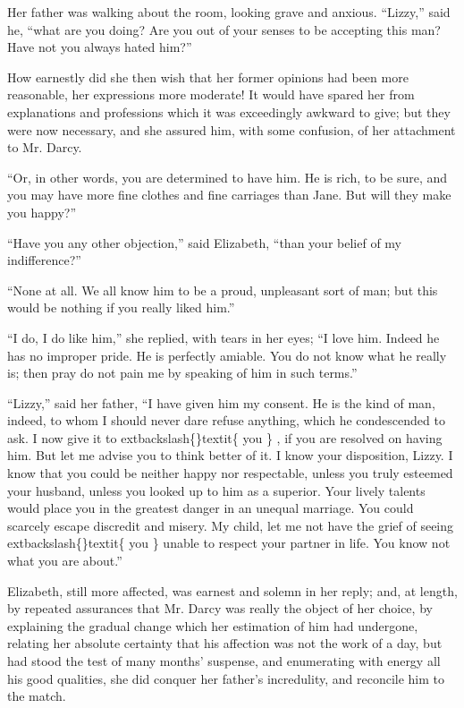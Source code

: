 \documentclass[10pt]{book}
\begin{document}
   Her father was walking about the room, looking grave and anxious.
“Lizzy,” said he, “what are you doing? Are you out of your senses to be
accepting this man? Have not you always hated him?”
  

   How earnestly did she then wish that her former opinions had been more
reasonable, her expressions more moderate! It would have spared her from
explanations and professions which it was exceedingly awkward to give;
but they were now necessary, and she assured him, with some confusion,
of her attachment to Mr. Darcy.
  

   “Or, in other words, you are determined to have him. He is rich, to be
sure, and you may have more fine clothes and fine carriages than Jane.
But will they make you happy?”
  

   “Have you any other objection,” said Elizabeth, “than your belief of my
indifference?”
  

   “None at all. We all know him to be a proud, unpleasant sort of man; but
this would be nothing if you really liked him.”
  

   “I do, I do like him,” she replied, with tears in her eyes; “I love him.
Indeed he has no improper pride. He is perfectly amiable. You do not
know what he really is; then pray do not pain me by speaking of him in
such terms.”
  

   “Lizzy,” said her father, “I have given him my consent. He is the kind
of man, indeed, to whom I
   should never dare refuse anything, which he
condescended to ask. I now give it to
   	extbackslash\{\}textit\{
    you
   \}
   , if you are resolved on
having him. But let me advise you to think better of it. I know your
disposition, Lizzy. I know that you could be neither happy nor
respectable, unless you truly esteemed your husband, unless you looked
up to him as a superior. Your lively talents would place you in the
greatest danger in an unequal marriage. You could scarcely escape
discredit and misery. My child, let me not have the grief of seeing
   	extbackslash\{\}textit\{
    you
   \}
   unable to respect your partner in life. You know not what you are
about.”
  

   Elizabeth, still more affected, was earnest and solemn in her reply;
and, at length, by repeated assurances that Mr. Darcy was really the
object of her choice, by explaining the gradual change which her
estimation of him had undergone, relating her absolute certainty that
his affection was not the work of a day, but had stood the test of many
months’ suspense, and enumerating with energy all his good qualities,
she did conquer her father’s incredulity, and reconcile him to the
match.
  
\end{document}
